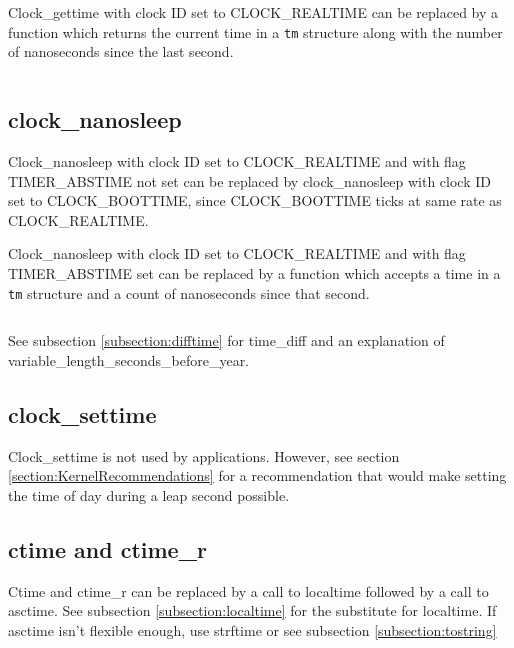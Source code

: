 \documentclass[letterpaper,twoside]{article}
\begin{document}
Clock\_gettime with clock ID set to CLOCK\_REAL\-TIME can be replaced by
a function which returns the current time in a \verb|tm| structure along
with the number of nanoseconds since the last second.
\inputminted[firstline=34]{c}{time_current_tm_nano.c}

\subsection{clock\_nanosleep}
Clock\_nanosleep with clock ID set to CLOCK\_REAL\-TIME and with flag
TIMER\_ABS\-TIME not set can be replaced by clock\_nanosleep with
clock ID set to CLOCK\_BOOTTIME, since CLOCK\_BOOTTIME ticks at
same rate as CLOCK\_REAL\-TIME.

Clock\_nanosleep with clock ID set to CLOCK\_REAL\-TIME and with flag
TIMER\_ABS\-TIME set can be replaced by a function which accepts
a time in a \verb|tm| structure and a count of nanoseconds since that second.
\inputminted[firstline=32]{c}{time_sleep_until.c}
See subsection \ref{subsection:difftime} for time\_diff
and an explanation of variable\_length\_sec\-onds\_before\_year.

\subsection{clock\_settime}
Clock\_settime is not used by applications.
However, see section \ref{section:KernelRecommendations} for a
recommendation that would make setting the time of day during a
leap second possible.

\subsection{ctime and ctime\_r}
Ctime and ctime\_r can be replaced by a call to localtime followed by
a call to asctime.  See subsection \ref{subsection:localtime}
for the substitute for localtime.
If asctime isn't flexible enough, use strftime or see subsection
\ref{subsection:tostring}
\end{document}
